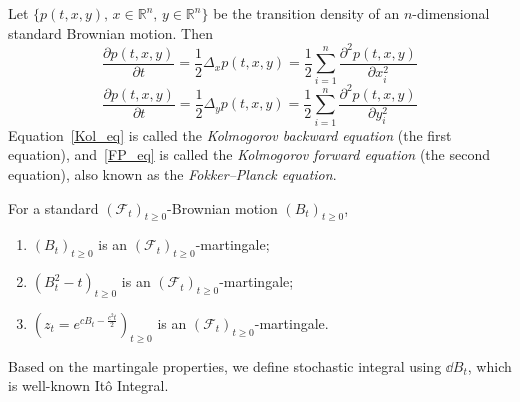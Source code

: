 \begin{prop}
Let $\{p(t, x, y), \, x \in \mathbb{R}^n, \, y \in \mathbb{R}^n\}$ be the transition density of an $n$-dimensional standard Brownian motion. Then
\begin{equation}
\label{Kol_eq}
\frac{\partial p(t, x, y)}{\partial t} = \frac{1}{2} \Delta_x p(t, x, y) = \frac{1}{2} \sum_{i=1}^{n} \frac{\partial^2 p(t, x, y)}{\partial x_i^2}
\end{equation}
\begin{equation}
\label{FP_eq}
\frac{\partial p(t, x, y)}{\partial t} = \frac{1}{2} \Delta_y p(t, x, y) = \frac{1}{2} \sum_{i=1}^{n} \frac{\partial^2 p(t, x, y)}{\partial y_i^2}
\end{equation}
Equation~\ref{Kol_eq} is called the \textit{Kolmogorov backward equation} (the first equation), and~\ref{FP_eq} is called the \textit{Kolmogorov forward equation} (the second equation), also known as the \textit{Fokker--Planck equation}.
\end{prop}

\begin{prop}
For a standard $(\mathcal{F}_t)_{t \geq 0}$-Brownian motion $(B_t)_{t \geq 0}$,
\begin{enumerate}
    \item $(B_t)_{t \geq 0}$ is an $(\mathcal{F}_t)_{t \geq 0}$-martingale;
    \item $(B_t^2 - t)_{t \geq 0}$ is an $(\mathcal{F}_t)_{t \geq 0}$-martingale;
    \item $(z_t = e^{cB_t - \frac{c^2 t}{2}})_{t \geq 0}$ is an $(\mathcal{F}_t)_{t \geq 0}$-martingale.
\end{enumerate}
\end{prop}

\begin{rem}
    Based on the martingale properties, we define stochastic integral using $\dd B_t$, which is well-known Itô Integral.
\end{rem}

